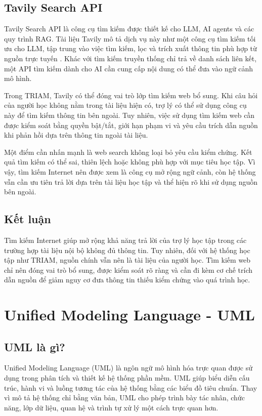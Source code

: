 \documentclass[12pt,a4paper]{report}
\begin{document}
\subsection{Tavily Search API}

Tavily Search API là công cụ tìm kiếm được thiết kế cho LLM, AI agents và các quy trình RAG. Tài liệu Tavily mô tả dịch vụ này như một công cụ tìm kiếm tối ưu cho LLM, tập trung vào việc tìm kiếm, lọc và trích xuất thông tin phù hợp từ nguồn trực tuyến \cite{tavilyDocs}. Khác với tìm kiếm truyền thống chỉ trả về danh sách liên kết, một API tìm kiếm dành cho AI cần cung cấp nội dung có thể đưa vào ngữ cảnh mô hình.

Trong TRIAM, Tavily có thể đóng vai trò lớp tìm kiếm web bổ sung. Khi câu hỏi của người học không nằm trong tài liệu hiện có, trợ lý có thể sử dụng công cụ này để tìm kiếm thông tin bên ngoài. Tuy nhiên, việc sử dụng tìm kiếm web cần được kiểm soát bằng quyền bật/tắt, giới hạn phạm vi và yêu cầu trích dẫn nguồn khi phản hồi dựa trên thông tin ngoài tài liệu.

Một điểm cần nhấn mạnh là web search không loại bỏ yêu cầu kiểm chứng. Kết quả tìm kiếm có thể sai, thiên lệch hoặc không phù hợp với mục tiêu học tập. Vì vậy, tìm kiếm Internet nên được xem là công cụ mở rộng ngữ cảnh, còn hệ thống vẫn cần ưu tiên trả lời dựa trên tài liệu học tập và thể hiện rõ khi sử dụng nguồn bên ngoài.

\subsection{Kết luận}

Tìm kiếm Internet giúp mở rộng khả năng trả lời của trợ lý học tập trong các trường hợp tài liệu nội bộ không đủ thông tin. Tuy nhiên, đối với hệ thống học tập như TRIAM, nguồn chính vẫn nên là tài liệu của người học. Tìm kiếm web chỉ nên đóng vai trò bổ sung, được kiểm soát rõ ràng và cần đi kèm cơ chế trích dẫn nguồn để giảm nguy cơ đưa thông tin thiếu kiểm chứng vào quá trình học.

\section{Unified Modeling Language - UML}

\subsection{UML là gì?}

Unified Modeling Language (UML) là ngôn ngữ mô hình hóa trực quan được sử dụng trong phân tích và thiết kế hệ thống phần mềm. UML giúp biểu diễn cấu trúc, hành vi và luồng tương tác của hệ thống bằng các biểu đồ tiêu chuẩn. Thay vì mô tả hệ thống chỉ bằng văn bản, UML cho phép trình bày tác nhân, chức năng, lớp dữ liệu, quan hệ và trình tự xử lý một cách trực quan hơn.
\end{document}
